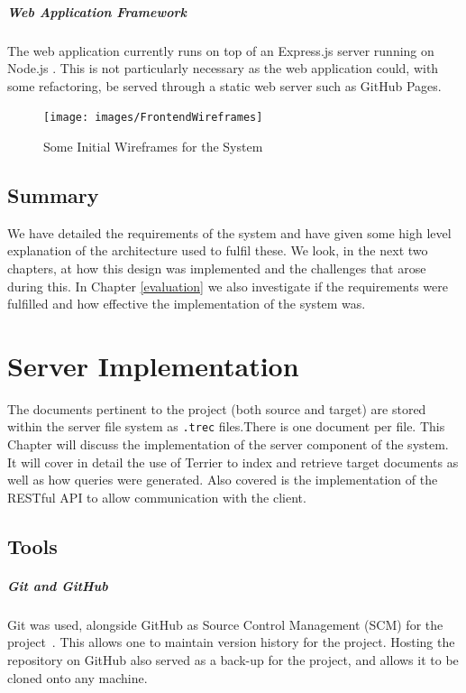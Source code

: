 \documentclass{l4proj}
\newcommand{\code}[1]{\texttt{#1}}
\begin{document}
\paragraph{Web Application Framework}
The web application currently runs on top of an Express.js server running on Node.js \cite{express,node}. This is not particularly necessary as the web application could, with some refactoring, be served through a static web server such as GitHub Pages.
\begin{figure}[H]
\centering
\texttt{[image: images/FrontendWireframes]}
\caption{Some Initial Wireframes for the System}
\label{wireframes}
\end{figure}

\section{Summary}
We have detailed the requirements of the system and have given some high level explanation of the architecture used to fulfil these. We look, in the next two chapters, at how this design was implemented and the challenges that arose during this. In Chapter \ref{evaluation} we also investigate if the requirements were fulfilled and how effective the implementation of the system was.

\chapter{Server Implementation} \label{serverimplementation}

The documents pertinent to the project (both source and target) are stored within the server file system as \code{.trec} files.There is one document per file.
This Chapter will discuss the implementation of the server component of the system. It will cover in detail the use of Terrier to index and retrieve target documents as well as how queries were generated. Also covered is the implementation of the RESTful API to allow communication with the client.

\section{Tools}
\paragraph{Git and GitHub}
Git was used, alongside GitHub as Source Control Management (SCM) for the project~\cite{git,github}. This allows one to maintain version history for the project. Hosting the repository on GitHub also served as a back-up for the project, and allows it to be cloned onto any machine.
\end{document}
